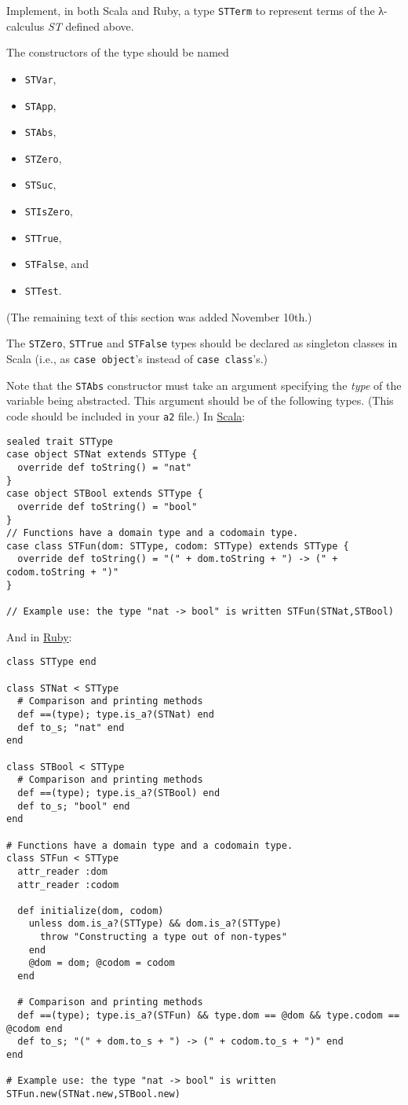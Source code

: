 \documentclass[11pt]{article}
\theoremstyle{definition}
\begin{document}
Implement, in both Scala and Ruby,
a type \texttt{STTerm} to represent terms of the λ-calculus \emph{ST} defined above.

The constructors of the type should be named
\begin{itemize}
\item \texttt{STVar},
\item \texttt{STApp},
\item \texttt{STAbs},
\item \texttt{STZero},
\item \texttt{STSuc},
\item \texttt{STIsZero},
\item \texttt{STTrue},
\item \texttt{STFalse}, and
\item \texttt{STTest}.
\end{itemize}

(The remaining text of this section was added November 10th.)

The \texttt{STZero}, \texttt{STTrue} and \texttt{STFalse} types should be declared as
singleton classes in Scala (i.e., as \texttt{case object}'s instead of \texttt{case class}'s.)

Note that the \texttt{STAbs} constructor must take an argument specifying
the \emph{type} of the variable being abstracted. This argument
should be of the following types.
(This code should be included in your \texttt{a2} file.)
In \href{./src/a2\_types.sc}{Scala}:
\begin{verbatim}
sealed trait STType
case object STNat extends STType {
  override def toString() = "nat"
}
case object STBool extends STType {
  override def toString() = "bool"
}
// Functions have a domain type and a codomain type.
case class STFun(dom: STType, codom: STType) extends STType {
  override def toString() = "(" + dom.toString + ") -> (" + codom.toString + ")"
}

// Example use: the type "nat -> bool" is written STFun(STNat,STBool)
\end{verbatim}
And in \href{./src/a2\_types.rb}{Ruby}:
\begin{verbatim}
class STType end

class STNat < STType
  # Comparison and printing methods
  def ==(type); type.is_a?(STNat) end
  def to_s; "nat" end
end

class STBool < STType
  # Comparison and printing methods
  def ==(type); type.is_a?(STBool) end
  def to_s; "bool" end
end

# Functions have a domain type and a codomain type.
class STFun < STType
  attr_reader :dom
  attr_reader :codom
  
  def initialize(dom, codom)
    unless dom.is_a?(STType) && dom.is_a?(STType)
      throw "Constructing a type out of non-types"
    end
    @dom = dom; @codom = codom
  end

  # Comparison and printing methods
  def ==(type); type.is_a?(STFun) && type.dom == @dom && type.codom == @codom end 
  def to_s; "(" + dom.to_s + ") -> (" + codom.to_s + ")" end
end

# Example use: the type "nat -> bool" is written STFun.new(STNat.new,STBool.new)
\end{verbatim}
\end{document}
